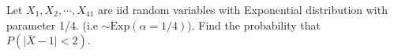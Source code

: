 \documentclass[addpoints]{examsetup}
\begin{document}
\begin{questions}

\question[4]
Let $X_1, X_2, \cdots, X_{41}$ are iid random variables with Exponential distribution with parameter 1/4. (i.e $\sim\text{Exp}(\alpha= 1/4)$). Find the probability that $P(\vert\overline{X}- 1\vert < 2)$.
\end{questions}
\end{document}
